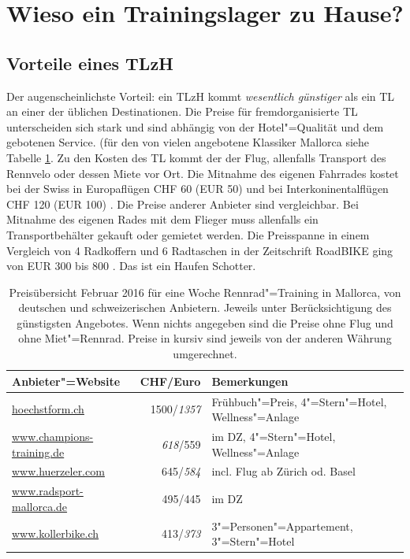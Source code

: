 \documentclass[a4paper,DIV13,BCOR0cm,draft=TRUE]{scrartcl}
\newcommand{\rv}{Rennvelo}
\newcommand{\tlzh}{TLzH}
\begin{document}

\section{Wieso ein Trainingslager zu Hause?}
\label{sec:wiesozuhause}

\subsection{Vorteile eines \tlzh}

Der augenscheinlichste Vorteil:
ein \tlzh{} kommt \emph{wesentlich günstiger} als ein TL an einer der üblichen Destinationen.
Die Preise für fremdorganisierte TL unterscheiden sich stark
und sind abhängig von der Hotel"=Qualität und dem gebotenen Service.
(für den von vielen angebotene Klassiker Mallorca siehe Tabelle \ref{tab:preisvergleich}.
Zu den Kosten des TL kommt der der Flug, allenfalls Transport des \rv{} oder dessen Miete vor Ort.
Die Mitnahme des eigenen Fahrrades kostet bei der Swiss in Europaflügen CHF 60 (EUR 50) und bei Interkoninentalflügen CHF 120 (EUR 100)
\cite{swiss2016fahrradmitnahme}. Die Preise anderer Anbieter sind vergleichbar.
Bei Mitnahme des eigenen Rades mit dem Flieger muss allenfalls ein Transportbehälter gekauft oder gemietet werden.
Die Preisspanne in einem Vergleich von 4 Radkoffern und 6 Radtaschen in der Zeitschrift RoadBIKE ging von EUR 300 bis 800
\cite{Brunker2015radkoffer}.
Das ist ein Haufen Schotter.

\begin{table}
  \centering
  \begin{tabular}{lrl}
    \toprule
        Anbieter"=Website & CHF/Euro & Bemerkungen \\
    \midrule
        \url{hoechstform.ch} & 1500/\textsl{1357} & Frühbuch"=Preis, 4"=Stern"=Hotel, Wellness"=Anlage \\
        \url{www.champions-training.de} & \textsl{618}/559 & im DZ, 4"=Stern"=Hotel, Wellness"=Anlage \\
        \url{www.huerzeler.com} & 645/\textsl{584} & incl. Flug ab Zürich od. Basel\\
        \url{www.radsport-mallorca.de} & 495/445 & im DZ \\
        \url{www.kollerbike.ch} & 413/\textsl{373} & 3"=Personen"=Appartement, 3"=Stern"=Hotel \\
    \bottomrule
  \end{tabular}
  \caption{Preisübersicht Februar 2016 für eine Woche Rennrad"=Training in Mallorca,
    von deutschen und schweizerischen Anbietern.
    Jeweils unter Berücksichtigung des günstigsten Angebotes.
    Wenn nichts angegeben sind die Preise ohne Flug und ohne Miet"=Rennrad.
  Preise in kursiv sind jeweils von der anderen Währung umgerechnet.}
  \label{tab:preisvergleich}
\end{table}
\end{document}
